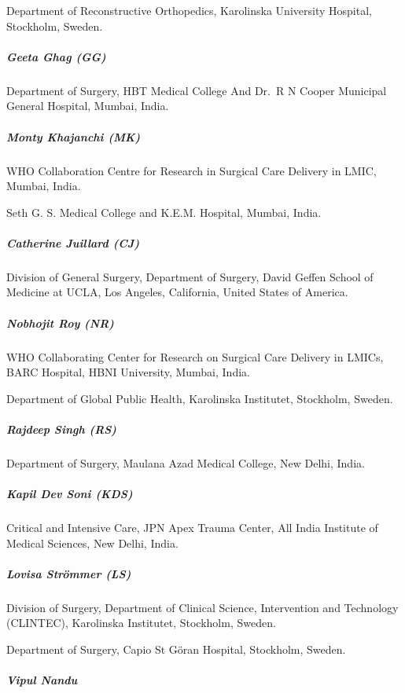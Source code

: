 \documentclass[
]{article}
\begin{document}
Department of Reconstructive Orthopedics, Karolinska University Hospital, Stockholm, Sweden.

\hypertarget{geeta-ghag-gg}{%
\subparagraph{Geeta Ghag (GG)}\label{geeta-ghag-gg}}

Department of Surgery, HBT Medical College And Dr.~R N Cooper Municipal General Hospital, Mumbai, India.

\hypertarget{monty-khajanchi-mk}{%
\subparagraph{Monty Khajanchi (MK)}\label{monty-khajanchi-mk}}

WHO Collaboration Centre for Research in Surgical Care Delivery in LMIC, Mumbai, India.

Seth G. S. Medical College and K.E.M. Hospital, Mumbai, India.

\hypertarget{catherine-juillard-cj}{%
\subparagraph{Catherine Juillard (CJ)}\label{catherine-juillard-cj}}

Division of General Surgery, Department of Surgery, David Geffen School of Medicine at UCLA, Los Angeles, California, United States of America.

\hypertarget{nobhojit-roy-nr}{%
\subparagraph{Nobhojit Roy (NR)}\label{nobhojit-roy-nr}}

WHO Collaborating Center for Research on Surgical Care Delivery in LMICs, BARC Hospital, HBNI University, Mumbai, India.

Department of Global Public Health, Karolinska Institutet, Stockholm, Sweden.

\hypertarget{rajdeep-singh-rs}{%
\subparagraph{Rajdeep Singh (RS)}\label{rajdeep-singh-rs}}

Department of Surgery, Maulana Azad Medical College, New Delhi, India.

\hypertarget{kapil-dev-soni-kds}{%
\subparagraph{Kapil Dev Soni (KDS)}\label{kapil-dev-soni-kds}}

Critical and Intensive Care, JPN Apex Trauma Center, All India Institute of Medical Sciences, New Delhi, India.

\hypertarget{lovisa-struxf6mmer-ls}{%
\subparagraph{Lovisa Strömmer (LS)}\label{lovisa-struxf6mmer-ls}}

Division of Surgery, Department of Clinical Science, Intervention and Technology (CLINTEC), Karolinska Institutet, Stockholm, Sweden.

Department of Surgery, Capio St Göran Hospital, Stockholm, Sweden.

\hypertarget{vipul-nandu}{%
\subparagraph{Vipul Nandu}\label{vipul-nandu}}
\end{document}
